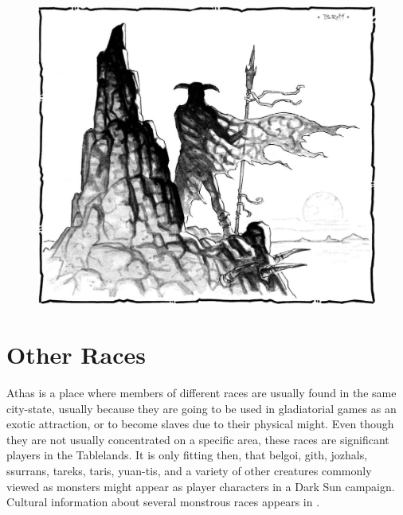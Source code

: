 \begin{figure}[b!]
\centering
\includegraphics[width=\textwidth-2cm]{images/adventurer-2.png}
\WOTC
\end{figure}

\section{Other Races}
Athas is a place where members of different races are usually found in the same city-state, usually because they are going to be used in gladiatorial games as an exotic attraction, or to become slaves due to their physical might. Even though they are not usually concentrated on a specific area, these races are significant players in the Tablelands. It is only fitting then, that belgoi, gith, jozhals, ssurrans, tareks, taris, yuan-tis, and a variety of other creatures commonly viewed as monsters might appear as player characters in a {\tableheader Dark Sun} campaign. Cultural information about several monstrous races appears in .
